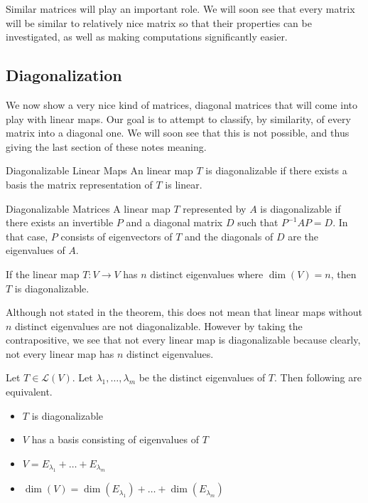 \documentclass[a4paper]{article}
\begin{document}
Similar matrices will play an important role. We will soon see that every matrix will be similar to relatively nice matrix so that their properties can be investigated, as well as making computations significantly easier. 

\subsection{Diagonalization}
We now show a very nice kind of matrices, diagonal matrices that will come into play with linear maps. Our goal is to attempt to classify, by similarity, of every matrix into a diagonal one. We will soon see that this is not possible, and thus giving the last section of these notes meaning. 

\begin{defn}{Diagonalizable Linear Maps}{} An linear map $T$ is diagonalizable if there exists a basis the matrix representation of $T$ is linear. 
\end{defn}

\begin{prp}{Diagonalizable Matrices}{} A linear map $T$ represented by $A$ is diagonalizable if there exists an invertible $P$ and a diagonal matrix $D$ such that $P^{-1}AP=D$. In that case, $P$ consists of eigenvectors of $T$ and the diagonals of $D$ are the eigenvalues of $A$. 
\end{prp}

\begin{thm}{}{} If the linear map $T:V\to V$ has $n$ distinct eigenvalues where $\dim(V)=n$, then $T$ is diagonalizable. 
\end{thm}

Although not stated in the theorem, this does not mean that linear maps without $n$ distinct eigenvalues are not diagonalizable. However by taking the contrapositive, we see that not every linear map is diagonalizable because clearly, not every linear map has $n$ distinct eigenvalues. 

\begin{thm}{}{} Let $T\in\mathcal{L}(V)$. Let $\lambda_1,\dots,\lambda_m$ be the distinct eigenvalues of $T$. Then following are equivalent. 
\begin{itemize}
\item $T$ is diagonalizable
\item $V$ has a basis consisting of eigenvalues of $T$
\item $V=E_{\lambda_1}+\dots+E_{\lambda_m}$
\item $\dim(V)=\dim(E_{\lambda_1})+\dots+\dim(E_{\lambda_m})$
\end{itemize}
\end{thm}
\end{document}
